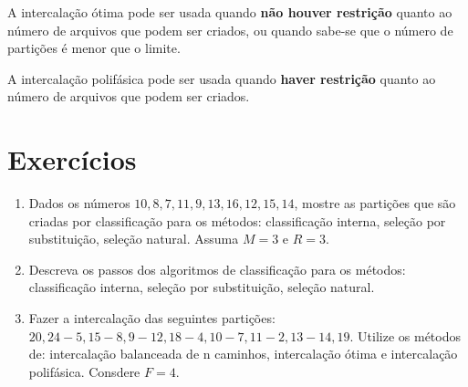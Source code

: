 A intercalação ótima pode ser usada quando {\bf não houver restrição} quanto ao
número de arquivos que podem ser criados, ou quando sabe-se que o número de
partições é menor que o limite.

A intercalação polifásica pode ser usada quando {\bf haver restrição} quanto ao
número de arquivos que podem ser criados.

\section{Exercícios}

\begin{enumerate}
\item Dados os números $10, 8, 7, 11, 9, 13, 16, 12, 15, 14$, mostre as partições
que são criadas por classificação para os métodos: classificação interna, seleção
por substituição, seleção natural.
Assuma $M = 3$ e $R = 3$.

\item Descreva os passos dos algoritmos de classificação para os métodos:
classificação interna, seleção por substituição, seleção natural.

\item Fazer a intercalação das seguintes partições:
$20, 24 - 5, 15 - 8, 9 - 12, 18 - 4, 10 - 7, 11 - 2, 13 - 14, 19$.
Utilize os métodos de: intercalação balanceada de n caminhos, intercalação ótima e intercalação
polifásica.
Consdere $F = 4$.

\end{enumerate}
